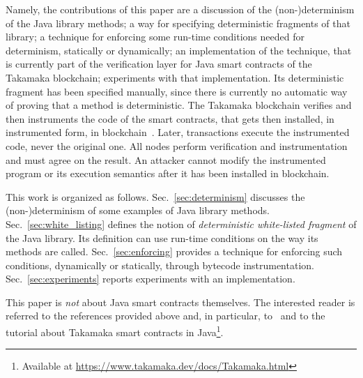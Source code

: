 Namely, the contributions of this paper are a discussion of the (non-)determi\-nism
of the Java library methods; a way for specifying deterministic fragments
of that library; a technique for
enforcing some run-time conditions needed for determinism, statically or dynamically;
an implementation of the technique, that is currently part of the verification
layer for Java smart contracts of the Takamaka blockchain;
experiments with that implementation.
Its deterministic fragment has been specified manually, since there is
currently no automatic way of proving that a method is deterministic.
The Takamaka blockchain verifies and then instruments the code of the smart contracts, that gets
then installed, in instrumented form, in blockchain~\cite{Spoto19}. Later, transactions execute the
instrumented code, never the original one. All nodes perform verification and instrumentation
and must agree on the result. An attacker cannot modify the instrumented program
or its execution semantics after it has been installed in blockchain.

This work is organized as follows.
Sec.~\ref{sec:determinism} discusses the (non-)determinism of some
examples of Java library methods.
Sec.~\ref{sec:white_listing} defines the notion of \emph{deterministic white-listed fragment} of the Java library.
Its definition can use run-time conditions on the way its methods are called.
Sec.~\ref{sec:enforcing} provides a technique for enforcing such conditions, dynamically
or statically, through bytecode instrumentation.
Sec.~\ref{sec:experiments} reports experiments with an implementation.

This paper is \emph{not} about Java smart contracts themselves. The interested reader
is referred to the references provided above and, in particular, to~\cite{Spoto19}
and to the tutorial about Takamaka smart contracts in
Java\footnote{Available at \url{https://www.takamaka.dev/docs/Takamaka.html}}.
